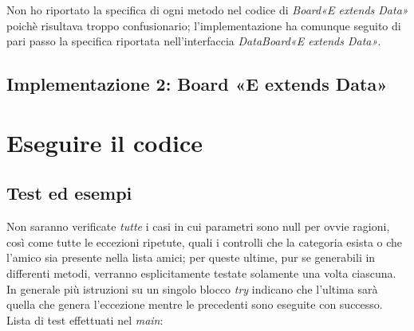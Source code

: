 \documentclass[10pt, a4paper]{article}
\begin{document}
Non ho riportato la specifica di ogni metodo nel codice di \textit{Board«E extends Data»} poichè risultava troppo confusionario; l'implementazione ha comunque seguito di pari passo la specifica riportata nell'interfaccia \textit{DataBoard«E extends Data»}.

\subsection{Implementazione 2: Board «E extends Data» }



\clearpage
\section{Eseguire il codice}
\subsection{Test ed esempi}
Non saranno verificate \textit{tutte} i casi in cui parametri sono null per ovvie ragioni, così come tutte le eccezioni ripetute, quali i controlli che la categoria esista o che l'amico sia presente nella lista amici; per queste ultime, pur se generabili in differenti metodi, verranno esplicitamente testate solamente una volta ciascuna. In generale più istruzioni su un singolo blocco \textit{try} indicano che l'ultima sarà quella che genera l'eccezione mentre le precedenti sono eseguite con successo.\\
Lista di test effettuati nel \textit{main}:
\end{document}
